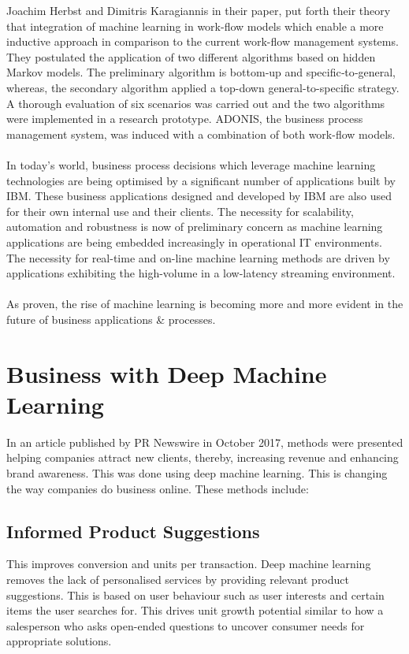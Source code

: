 \documentclass{article}
\begin{document}
Joachim Herbst and Dimitris Karagiannis in their paper, put forth their theory that integration of machine learning in work-flow models which enable a more inductive approach in comparison to the current work-flow management systems. They postulated the application of two different algorithms based on hidden Markov models. The preliminary algorithm is bottom‐up and specific‐to‐general, whereas, the secondary algorithm applied a top-down general-to-specific strategy. A thorough evaluation of six scenarios was carried out and the two algorithms were implemented in a research prototype. ADONIS, the business process management system, was induced with a combination of both work-flow models.\cite{herbst2000integrating}
\\\\
In today's world, business process decisions which leverage machine learning technologies are being optimised by a significant number of applications built by IBM. These business applications designed and developed by IBM are also used for their own internal use and their clients. The necessity for scalability, automation and robustness is now of preliminary concern as machine learning applications are being embedded increasingly in operational IT environments. The necessity for real-time and on-line machine learning methods are driven by applications exhibiting the high-volume in a low-latency streaming environment.\cite{apte2010role}
\\\\
As proven, the rise of machine learning is becoming more and more evident in the future of business applications & processes.

\section{Business with Deep Machine Learning}
In an article published by PR Newswire in October 2017, methods were presented helping companies attract new clients, thereby, increasing revenue and enhancing brand awareness. This was done using deep machine learning.\cite{201710170500PR.NEWS.USPR.MN1534920171017}
This is changing the way companies do business online. These methods include:

\subsection{Informed Product Suggestions}
This improves conversion and units per transaction. Deep machine learning removes the lack of personalised services by providing relevant product suggestions. This is based on user behaviour such as user interests and certain items the user searches for. This drives unit growth potential similar to how a salesperson who asks open-ended questions to uncover consumer needs for appropriate solutions.\cite{201710170500PR.NEWS.USPR.MN1534920171017}
\end{document}
